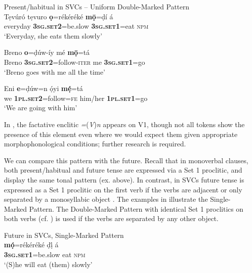 \documentclass[output=paper]{langsci/langscibook}
\begin{document}
\ea
{Present/habitual in SVCs – Uniform Double-Marked Pattern}\\
   \ea\label{ex:rolle:14}
\gll   Tẹvúró tẹvuro  \textbf{ọ}=rékéréké       \textbf{mọ̄}=ḍí       á\\ 
       everyday     \textbf{\textsc{3sg.set2}}=be.slow  \textbf{\textsc{3sg.set1}}=eat  \textsc{npm}\\
\glt ‘Everyday, she eats them slowly’ 

\ex\label{ex:rolle:15}
\gll   Breno   \textbf{o}=ḍúw-íy         mé   \textbf{mọ̄}=tá\\ 
       Breno   \textbf{\textsc{3sg.set2}}=follow-\textsc{iter}  me   \textbf{3}\textbf{\textsc{sg.set1}}\textsc{=}go\\
\glt ‘Breno goes with me all the time’

\ex\label{ex:rolle:16}
\gll   Eni   \textbf{e}=ḍúw=n       ọ́yi       \textbf{mẹ́}=tá\\ 
       we   \textbf{\textsc{1pl.set2}}=follow=\textsc{fe}   him/her    \textbf{\textsc{1pl.set1}}=go\\
\glt ‘We are going with him’
\z
\z 

In , the factative enclitic \textit{=}(\textit{V})\textit{n} appears on V1, though not all tokens show the presence of this element even where we would expect them given appropriate morphophonological conditions; further research is required. 

We can compare this pattern with the future. Recall that in monoverbal clauses, both present/habitual and future tense are expressed via a Set 1 proclitic, and display the same tonal pattern (ex.  above). In contrast, in SVCs future tense is expressed as a Set 1 proclitic on the first verb if the verbs are adjacent or only separated by a monosyllabic object . The examples in  illustrate the Single-Marked Pattern. The Double-Marked Pattern with identical Set 1 proclitics on both verbs (cf. ) is used if the verbs are separated by any other object. 


\ea\label{ex:rolle:17}
{Future in SVCs, Single-Marked Pattern}\\
    \ea 
\gll   \textbf{mọ́}=rékéréké     ḍị́   á\\ 
       \textbf{\textsc{3sg.set1}}=be.slow   eat   \textsc{npm}\\
\glt ‘(S)he will eat (them) slowly’ 
\end{document}
